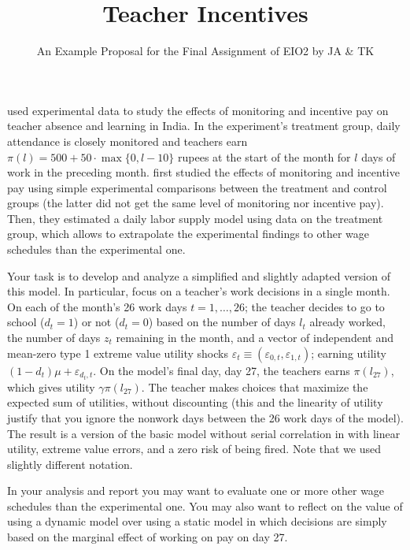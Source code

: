 \documentclass[fleqn,12pt]{article}
\title{Teacher Incentives}
\author{An Example Proposal for the Final Assignment of EIO2 by JA \& TK}
\date{}
\begin{document}
\maketitle

\citet{aer12:dufloetal} used experimental data to study the effects of monitoring and incentive pay on teacher absence and learning in India. In the experiment's treatment group, daily attendance is closely monitored and teachers earn $\pi(l)=500+50\cdot\max\{0,l-10\}$ rupees at the start of the month for $l$ days of work in the preceding month. \citeauthor{aer12:dufloetal} first studied the effects of monitoring and incentive pay using simple experimental comparisons between the treatment and control groups (the latter did not get the same level of monitoring nor incentive pay). Then, they estimated a daily labor supply model using data on the treatment group, which allows to extrapolate the experimental findings to other wage schedules than the experimental one. 

Your task is to develop and analyze a simplified and slightly adapted version of this model. In particular, focus on a teacher's work decisions in a single month. On each of the month's 26 work days $t=1,\ldots,26$; the teacher decides to go to school ($d_t=1$) or not ($d_t=0$) based on the number of days $l_t$ already worked, the number of days $z_t$ remaining in the month, and a vector of independent and mean-zero type 1 extreme value utility shocks $\varepsilon_t\equiv(\varepsilon_{0,t},\varepsilon_{1,t})$; earning utility $(1-d_t)\mu+\varepsilon_{d_t,t}$. On the model's final day, day 27, the teachers earns $\pi(l_{27})$, which gives utility $\gamma\pi(l_{27})$.  The teacher makes choices that maximize the expected sum of utilities, without discounting (this and the linearity of utility justify that you ignore the nonwork days between the 26 work days of the model). The result is a version of the basic model without serial correlation in \citet[][Section III]{aer12:dufloetal} with linear utility, extreme value errors, and a zero risk of being fired. Note that we used slightly different notation.

In your analysis and report you may want to evaluate one or more other wage schedules than the experimental one. You may also want to reflect on the value of using a dynamic model over  using a static model in which decisions are simply based on the marginal effect of working on pay on day 27. 



\end{document}
